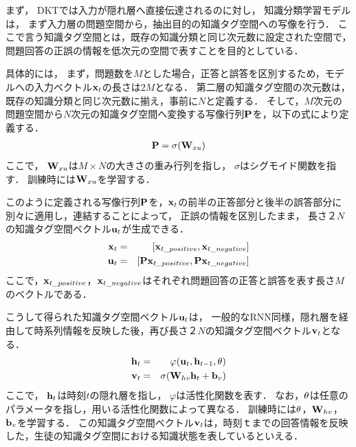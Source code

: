 まず，
DKTでは入力が隠れ層へ直接伝達されるのに対し，
知識分類学習モデルは，
まず入力層の問題空間から，抽出目的の知識タグ空間への写像を行う．
ここで言う知識タグ空間とは，既存の知識分類と同じ次元数に設定された空間で，
問題回答の正誤の情報を低次元の空間で表すことを目的としている．

具体的には，
まず，問題数を$M$とした場合，正答と誤答を区別するため，モデルへの入力ベクトル${\bf x}_t$の長さは$2M$となる．
第二層の知識タグ空間の次元数は，既存の知識分類と同じ次元数に揃え，事前に$N$と定義する．
そして，$M$次元の問題空間から$N$次元の知識タグ空間へ変換する写像行列${\bf P}$を，以下の式により定義する．
\begin{eqnarray}
{\bf P} = \sigma( {\bf W}_{xu})
\end{eqnarray}
ここで，
${\bf W}_{xu}$は$M \times N$の大きさの重み行列を指し，
$\sigma$はシグモイド関数を指す．
訓練時には${\bf W}_{xu}$を学習する．

このように定義される写像行列${\bf P}$を，${\bf x}_t$の前半の正答部分と後半の誤答部分に別々に適用し，連結することによって，
正誤の情報を区別したまま，
長さ$２N$の知識タグ空間ベクトル${\bf u}_t$が生成できる．
\begin{eqnarray}
{\bf x}_t &=& [{\bf x}_{t\_positive}, {\bf x}_{t\_negative}]\\
{\bf u}_t &=& [{\bf P} {\bf x}_{t\_positive}, {\bf P} {\bf x}_{t\_negative}]
\end{eqnarray}
ここで，${\bf x}_{t\_positive}$，${\bf x}_{t\_negative}$はそれぞれ問題回答の正答と誤答を表す長さ$M$のベクトルである．

こうして得られた知識タグ空間ベクトル${\bf u}_t$は，
一般的なRNN同様，隠れ層を経由して時系列情報を反映した後，再び長さ$２N$の知識タグ空間ベクトル${\bf v}_t$となる．
\begin{eqnarray}
{\bf h}_t &=& \varphi({\bf u}_t, {\bf h}_{t-1}, {\bf \theta})\\
{\bf v}_t &=& \sigma( {\bf W}_{hv} {\bf h}_t + {\bf b}_v)
\end{eqnarray}
ここで，
${\bf h}_t$は時刻$t$の隠れ層を指し，
$\varphi$は活性化関数を表す．
なお，${\bf \theta}$は任意のパラメータを指し，用いる活性化関数によって異なる．
訓練時には${\bf \theta}$，${\bf W}_{hv}$，${\bf b}_v$を学習する．
この知識タグ空間ベクトル${\bf v}_t$は，時刻$ｔ$までの回答情報を反映した，生徒の知識タグ空間における知識状態を表しているといえる．

